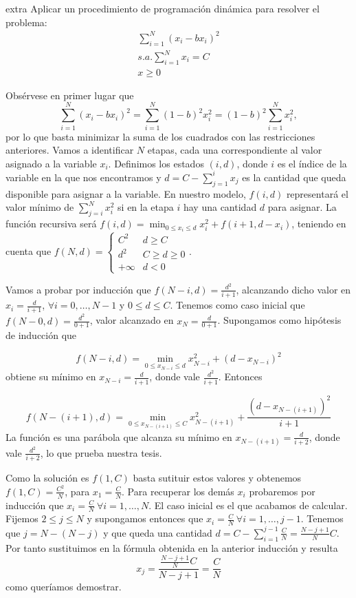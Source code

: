 \documentclass[twoside]{article}
\begin{document}
\newpage

\begin{ejercicio}{extra}
Aplicar un procedimiento de programación dinámica para resolver el problema:
\begin{align*}
\sum_{i=1}^N (x_i-bx_i)^2\\
s.a. \sum_{i=1}^N x_i=C\\
x\geq 0
\end{align*}
\end{ejercicio}
\begin{solucion}
Obsérvese en primer lugar que $$\sum_{i=1}^N (x_i-bx_i)^2=\sum_{i=1}^N (1-b)^2x_i^2=(1-b)^2\sum_{i=1}^N x_i^2,$$ por lo que basta minimizar la suma de los cuadrados con las restricciones anteriores. Vamos a identificar $N$ etapas, cada una correspondiente al valor asignado a la variable $x_i$. Definimos los estados $(i,d)$, donde $i$ es el índice de la variable en la que nos encontramos y $d=C-\sum_{j=1}^i x_j$ es la cantidad que queda disponible para asignar a la variable. En nuestro modelo, $f(i,d)$ representará el valor mínimo de $\sum_{j=i}^N x_i^2$ si en la etapa $i$ hay una cantidad $d$ para asignar. La función recursiva será $f(i,d)=\min_{0\leq x_i\leq d}  x_i^2+f(i+1,d-x_i)$, teniendo en cuenta que $f(N,d)=\begin{cases}
C^2 & d\geq C\\
d^2 & C\geq d\geq 0\\
+\infty & d<0
\end{cases}$. 

Vamos a probar por inducción que $f(N-i,d)=\frac{d^2}{i+1}$, alcanzando dicho valor en $x_i=\frac{d}{i+1}$, $\forall i=0,\dots, N-1$ y $0\leq d\leq C$. Tenemos como caso inicial que $f(N-0,d)=\frac{d^2}{0+1}$, valor alcanzado en $x_N=\frac{d}{0+1}$. Supongamos como hipótesis de inducción que

$$f(N-i,d)=\min_{0\leq x_{N-i}\leq d}x_{N-i}^2+(d-x_{N-i})^2$$
obtiene su mínimo en $x_{N-i}=\frac{d}{i+1}$, donde vale $\frac{d^2}{i+1}$. Entonces

$$f(N-(i+1),d)=\min_{0\leq x_{N-(i+1)}\leq C}x_{N-(i+1)}^2+\frac{(d-x_{N-(i+1)})^2}{i+1}$$
La función es una parábola que alcanza su mínimo en $x_{N-(i+1)}=\frac{d}{i+2}$, donde vale $\frac{d^2}{i+2}$, lo que prueba nuestra tesis.

Como la solución es $f(1,C)$ basta sutituir estos valores y obtenemos $f(1,C)=\frac{C^2}{N}$, para $x_1=\frac{C}{N}$. Para recuperar los demás $x_i$ probaremos por inducción que $x_i=\frac{C}{N}\ \forall i=1,\dots,N$. El caso inicial es el que acabamos de calcular. Fijemos $2\leq j\leq N$ y supongamos entonces que $x_i=\frac{C}{N}\ \forall i=1,\dots,j-1$. Tenemos que $j=N-(N-j)$ y que queda una cantidad $d=C-\sum_{i=1}^{j-1}\frac{C}{N}=\frac{N-j+1}{N}C$. Por tanto sustituimos en la fórmula obtenida en la anterior inducción y resulta
$$x_j=\frac{\frac{N-j+1}{N}C}{N-j+1}=\frac{C}{N}$$
como queríamos demostrar.
\end{solucion}
\end{document}
